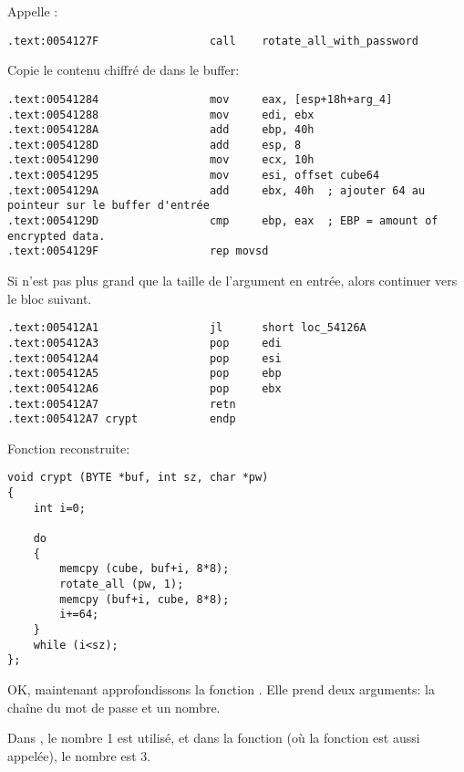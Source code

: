 Appelle :

\begin{lstlisting}[style=customasmx86]
.text:0054127F                 call    rotate_all_with_password
\end{lstlisting}

Copie le contenu chiffré de  dans le buffer:

\begin{lstlisting}[style=customasmx86]
.text:00541284                 mov     eax, [esp+18h+arg_4]
.text:00541288                 mov     edi, ebx
.text:0054128A                 add     ebp, 40h
.text:0054128D                 add     esp, 8
.text:00541290                 mov     ecx, 10h
.text:00541295                 mov     esi, offset cube64
.text:0054129A                 add     ebx, 40h  ; ajouter 64 au pointeur sur le buffer d'entrée
.text:0054129D                 cmp     ebp, eax  ; EBP = amount of encrypted data.
.text:0054129F                 rep movsd
\end{lstlisting}

Si \EBP n'est pas plus grand que la taille de l'argument en entrée, alors continuer
vers le bloc suivant.

\begin{lstlisting}[style=customasmx86]
.text:005412A1                 jl      short loc_54126A
.text:005412A3                 pop     edi
.text:005412A4                 pop     esi
.text:005412A5                 pop     ebp
.text:005412A6                 pop     ebx
.text:005412A7                 retn
.text:005412A7 crypt           endp
\end{lstlisting}

Fonction  reconstruite:

\begin{lstlisting}[style=customc]
void crypt (BYTE *buf, int sz, char *pw)
{
	int i=0;
	
	do
	{
		memcpy (cube, buf+i, 8*8);
		rotate_all (pw, 1);
		memcpy (buf+i, cube, 8*8);
		i+=64;
	}
	while (i<sz);
};
\end{lstlisting}

OK, maintenant approfondissons la fonction .
Elle prend deux arguments: la chaîne du mot de passe et un nombre.

Dans , le nombre 1 est utilisé, et dans la fonction  (où
la fonction  est aussi appelée), le nombre est 3.

